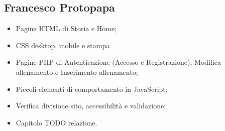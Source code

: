 \documentclass[a4paper]{article}
\begin{document}
    \subsection{Francesco Protopapa}
    \begin{itemize}
        \item Pagine HTML di Storia e Home;
        \item CSS desktop, mobile e stampa
        \item Pagine PHP di Autenticazione (Accesso e Registrazione), Modifica allenamento e Inserimento allenamento;
        \item Piccoli elementi di comportamento in JavaScript;
        \item Verifica divisione sito, accessibilità e validazione;
        \item Capitolo TODO relazione.        
    \end{itemize}
\end{document}
